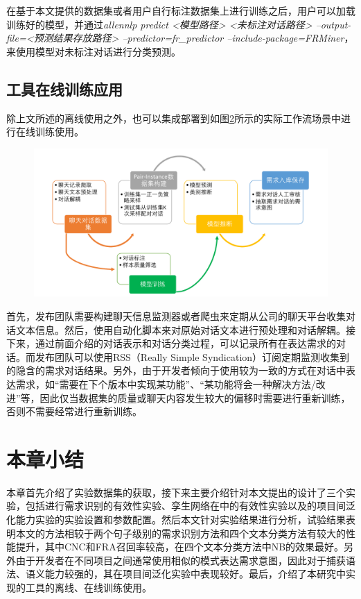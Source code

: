 \begin{figure}[htb]
    \label{fig:model-train}
\end{figure}

在基于本文提供的数据集或者用户自行标注数据集上进行训练之后，用户可以加载训练好的模型，并通过\textit{allennlp predict <模型路径> <未标注对话路径> --output-file=<预测结果存放路径> --predictor=fr\_predictor --include-package=FRMiner}，来使用模型对未标注对话进行分类预测。

\subsection{{\tool}工具在线训练应用}
除上文所述的离线使用之外，{\tool}也可以集成部署到如图\ref{fig:workflow}所示的实际工作流场景中进行在线训练使用。
\begin{figure}[htb]
    \centering
    \includegraphics[width=\textwidth]{Img/FRMiner-workflow.pdf}
    \label{fig:workflow}
\end{figure}
首先，发布团队需要构建聊天信息监测器或者爬虫来定期从公司的聊天平台收集对话文本信息。然后，使用自动化脚本\cite{kummerfeld2018large}来对原始对话文本进行预处理和对话解耦。接下来，通过前面介绍的对话表示和对话分类过程，{\tool}可以记录所有在表达需求的对话。而发布团队可以使用RSS（Really Simple Syndication）订阅定期监测收集到的隐含的需求对话结果。另外，由于开发者倾向于使用较为一致的方式在对话中表达需求，如“需要在下个版本中实现某功能”、“某功能将会一种解决方法/改进”等，因此仅当数据集的质量或聊天内容发生较大的偏移时{\tool}需要进行重新训练，否则{\tool}不需要经常进行重新训练。

\section{本章小结}

本章首先介绍了实验数据集的获取，接下来主要介绍针对本文提出的{\tool}设计了三个实验，包括{\tool}进行需求识别的有效性实验、孪生网络在{\tool}中的有效性实验以及{\tool}的项目间泛化能力实验的实验设置和参数配置。然后本文针对实验结果进行分析，试验结果表明本文的方法相较于两个句子级别的需求识别方法和四个文本分类方法有较大的性能提升，其中CNC和FRA召回率较高，在四个文本分类方法中NB的效果最好。另外由于开发者在不同项目之间通常使用相似的模式表达需求意图，因此对于捕获语法、语义能力较强的{\tool}，其在项目间泛化实验中表现较好。最后，介绍了本研究中实现的{\tool}工具的离线、在线训练使用。